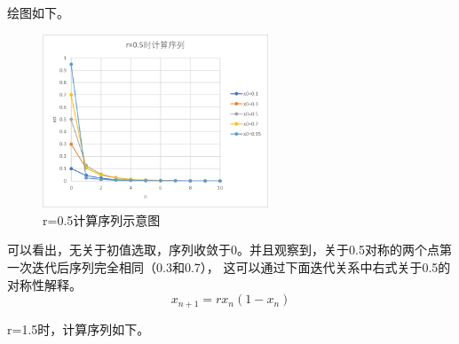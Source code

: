 \documentclass[10pt, a4paper]{article}
\begin{document}
    绘图如下。
    \begin{figure}[H]
        \centering
        \includegraphics[width=0.6\textwidth]{r=0.5计算序列.png}
        \caption{r=0.5计算序列示意图}\label{r=0.5计算序列示意图}
    \end{figure}

    可以看出，无关于初值选取，序列收敛于0。并且观察到，关于0.5对称的两个点第一次迭代后序列完全相同（0.3和0.7），
    这可以通过下面迭代关系中右式关于0.5的对称性解释。
    \begin{equation}
        x_{n+1}=rx_n(1-x_n)
    \end{equation}

    r=1.5时，计算序列如下。
\end{document}
